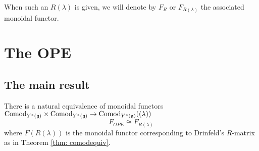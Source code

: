 \documentclass[11pt]{amsart}
\def\yscomod{{\rm Comod}_{Y^*(\fg)}}
\def\yslcomod{{\rm Comod}_{Y^*(\fg)}((\lambda))}
\begin{document}
When such an $R(\lambda)$ is given, we will denote by $F_R$ or $F_{R(\lambda)}$ the associated monoidal functor. 

\section{The OPE}

\subsection{The main result}



\begin{thm} 
There is a natural equivalence of monoidal functors $\yscomod \times \yscomod \to \yslcomod$ 
\[
F_{OPE} \cong F_{R(\lambda)}
\]
where $F(R(\lambda))$ is the monoidal functor corresponding to Drinfeld's $R$-matrix as in Theorem \ref{thm: comodequiv}.
\end{thm}  
\end{document}
